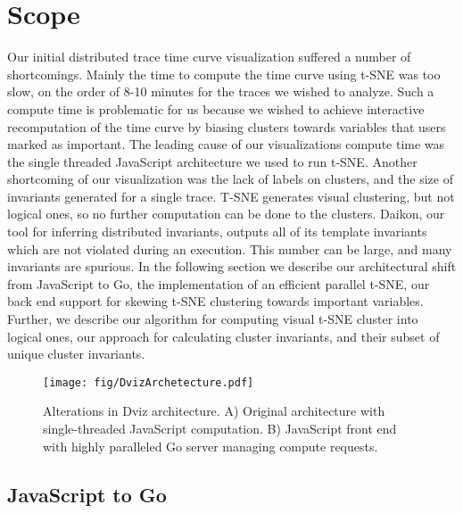 \section{Scope}
\label{sec:scope}

Our initial distributed trace time curve visualization suffered a number of
shortcomings. Mainly the time to compute the time curve using t-SNE was too
slow, on the order of 8-10 minutes for the traces we wished to analyze. Such a
compute time is problematic for us because we wished to achieve interactive
recomputation of the time curve by biasing clusters towards variables that
users marked as important. The leading cause of our visualizations compute time
was the single threaded JavaScript architecture we used to run t-SNE. Another
shortcoming of our visualization was the lack of labels on clusters, and the
size of invariants generated for a single trace. T-SNE generates visual
clustering, but not logical ones, so no further computation can be done to
the clusters. Daikon, our tool for inferring distributed invariants, outputs
all of its template invariants which are not violated during an execution. This
number can be large, and many invariants are spurious. In the following section
we describe our architectural shift from JavaScript to Go, the implementation
of an efficient  parallel t-SNE, our back end support for skewing t-SNE
clustering towards important variables. Further, we describe our algorithm for
computing visual t-SNE cluster into logical ones, our approach for calculating
cluster invariants, and their subset of unique cluster invariants.

\begin{figure}[t]
\centering
    \texttt{[image: fig/DvizArchetecture.pdf]}

    \caption{Alterations in Dviz architecture. A) Original
    architecture with single-threaded JavaScript computation. B)
    JavaScript front end with highly paralleled Go server managing
    compute requests.}

    \label{fig:dviz-archetecture}
\end{figure}

\subsection{JavaScript to Go}
\label{sec:js2go}

